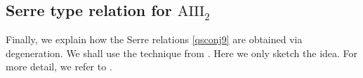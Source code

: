 \documentclass[11pt,reqno]{amsart}
\numberwithin{equation}{section}
\theoremstyle{definition}
\theoremstyle{remark}
\newcommand{\Sym}{{\mathrm{Sym}}}
\def \bh{\mathbf{h}}
\def \bb{\mathbf{b}}
\def \h{\hbar}
\def \Gr{\mathrm{Gr}}
\def \Sym{\mathrm{Sym}}
\def \tUi{\mathbf{U}^\imath}
\begin{document}

\iffalse
\subsection{Serre type relation for $\mathrm{AIII}_2$}
Finally, we explain how the Serre relations \eqref{qsconj9} are obtained via degeneration. We shall use the technique from \cite[\S 6]{KLWZ23b}. Here we only sketch the idea. For more detail, we refer to \cite[\S 6]{KLWZ23b}.
\end{document}
